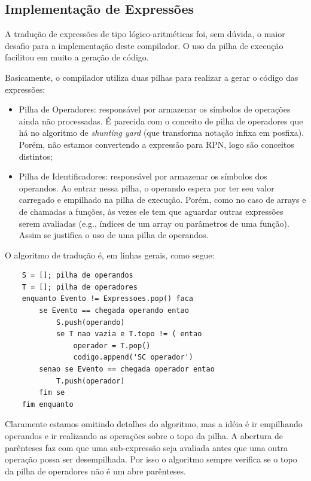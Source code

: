 \documentclass[a4paper,12pt]{report}
\begin{document}
    \subsection*{Implementação de Expressões}
    A tradução de expressões de tipo lógico-aritméticas foi, sem dúvida, o maior desafio para a implementação deste compilador. O uso da pilha de execução facilitou em muito a geração de código.

    Basicamente, o compilador utiliza duas pilhas para realizar a gerar o código das expressões:
    \begin{itemize}
        \item Pilha de Operadores: responsável por armazenar os símbolos de operações ainda não processadas. É parecida com o conceito de pilha de operadores que há no algoritmo de \textit{shunting yard} (que transforma notação infixa em posfixa). Porém, não estamos convertendo a expressão para RPN, logo são conceitos distintos;
        \item Pilha de Identificadores: responsável por armazenar os símbolos dos operandos. Ao entrar nessa pilha, o operando espera por ter seu valor carregado e empilhado na pilha de execução. Porém, como no caso de arrays e de chamadas a funções, às vezes ele tem que aguardar outras expressões serem avaliadas (e.g., índices de um array ou parâmetros de uma função). Assim se justifica o uso de uma pilha de operandos.
    \end{itemize}

    O algoritmo de tradução é, em linhas gerais, como segue:

    \begin{lstlisting}
    S = []; pilha de operandos
    T = []; pilha de operadores
    enquanto Evento != Expressoes.pop() faca
        se Evento == chegada operando entao
            S.push(operando)
            se T nao vazia e T.topo != ( entao
                operador = T.pop()
                codigo.append('SC operador')
        senao se Evento == chegada operador entao
            T.push(operador)
        fim se
    fim enquanto
    \end{lstlisting}

    Claramente estamos omitindo detalhes do algoritmo, mas a idéia é ir empilhando operandos e ir realizando as operações sobre o topo da pilha. A abertura de parênteses faz com que uma sub-expressão seja avaliada antes que uma outra operação possa ser desempilhada. Por isso o algoritmo sempre verifica se o topo da pilha de operadores não é um abre parênteses.
\end{document}
